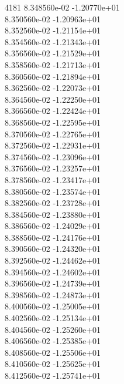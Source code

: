 4181	8.348560e-02	-1.20770e+01	\\ 	8.350560e-02	-1.20963e+01	\\ 	8.352560e-02	-1.21154e+01	\\ 	8.354560e-02	-1.21343e+01	\\ 	8.356560e-02	-1.21529e+01	\\ 	8.358560e-02	-1.21713e+01	\\ 	8.360560e-02	-1.21894e+01	\\ 	8.362560e-02	-1.22073e+01	\\ 	8.364560e-02	-1.22250e+01	\\ 	8.366560e-02	-1.22424e+01	\\ 	8.368560e-02	-1.22595e+01	\\ 	8.370560e-02	-1.22765e+01	\\ 	8.372560e-02	-1.22931e+01	\\ 	8.374560e-02	-1.23096e+01	\\ 	8.376560e-02	-1.23257e+01	\\ 	8.378560e-02	-1.23417e+01	\\ 	8.380560e-02	-1.23574e+01	\\ 	8.382560e-02	-1.23728e+01	\\ 	8.384560e-02	-1.23880e+01	\\ 	8.386560e-02	-1.24029e+01	\\ 	8.388560e-02	-1.24176e+01	\\ 	8.390560e-02	-1.24320e+01	\\ 	8.392560e-02	-1.24462e+01	\\ 	8.394560e-02	-1.24602e+01	\\ 	8.396560e-02	-1.24739e+01	\\ 	8.398560e-02	-1.24873e+01	\\ 	8.400560e-02	-1.25005e+01	\\ 	8.402560e-02	-1.25134e+01	\\ 	8.404560e-02	-1.25260e+01	\\ 	8.406560e-02	-1.25385e+01	\\ 	8.408560e-02	-1.25506e+01	\\ 	8.410560e-02	-1.25625e+01	\\ 	8.412560e-02	-1.25741e+01	\\ \hline
